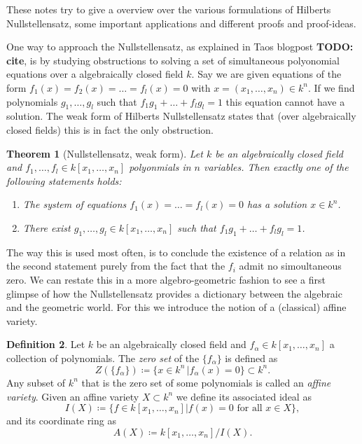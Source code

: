 \documentclass[11pt, a4paper, english, twoside]{article}
\theoremstyle{plain}
\newtheorem{theorem}{Theorem}[section]
\theoremstyle{definition}
\newtheorem{definition}[theorem]{Definition}
\begin{document}

These notes try to give a overview over the various formulations of Hilberts Nullstellensatz, some important applications and different proofs and proof-ideas.

One way to approach the Nullstellensatz, as explained in Taos blogpost \textbf{TODO: cite}, is by studying obstructions to solving a set of simultaneous polyonomial equations over a algebraically closed field $k$.
Say we are given equations of the form $f_1(x) = f_2(x) = \dots = f_l(x) = 0$ with $x = (x_1, \dots, x_n) \in k^n$. If we find polynomials $g_1, \dots, g_l$ such that $f_1g_1 + \dots + f_lg_l = 1$ this equation cannot have a
solution. The weak form of Hilberts Nullstellensatz states that (over algebraically closed fields) this is in fact the only obstruction.

\begin{theorem}[Nullstellensatz, weak form]
    Let $k$ be an algebraically closed field and $f_1,\dots,f_l \in k[x_1,\dots,x_n]$ polyonmials in $n$ variables. 
    Then exactly one of the following statements holds:
    \begin{enumerate}
        \item The system of equations $f_1(x) = \dots =f_l(x) = 0$ has a solution $x \in k^n$.
        \item There exist $g_1, \dots, g_l \in k[x_1,\dots,x_n]$ such that $f_1g_1 + \dots + f_lg_l = 1$.
    \end{enumerate}
\end{theorem}
The way this is used most often, is to conclude the existence of a relation as in the second statement purely from the fact that the $f_i$ admit no simoultaneous zero.
We can restate this in a more algebro-geometric fashion to see a first glimpse of how the Nullstellensatz provides a dictionary between the algebraic and the geometric world. For this we introduce the notion of a 
(classical) affine variety.

\begin{definition}
    Let $k$ be an algebraically closed field and $f_\alpha \in k[x_1,\dots,x_n]$ a collection of polynomials. The \emph{zero set} of the $\{f_\alpha\}$ is defined as
    \[
        Z(\{f_\alpha\}) \coloneqq \{ x \in k^n \,| f_\alpha(x) = 0 \} \subset k^n.
    \]
    Any subset of $k^n$ that is the zero set of some polynomials is called an \emph{affine variety}.
    Given an affine variety $X \subset k^n$ we define its associated ideal as
    \[ 
        I(X) \coloneqq \{f \in k[x_1,\dots,x_n] | f(x) = 0 \text{ for all } x \in X \},
    \]
    and its coordinate ring as
    \[
        A(X) \coloneqq k[x_1,\dots,x_n]/I(X).
    \]
\end{definition}
\end{document}

